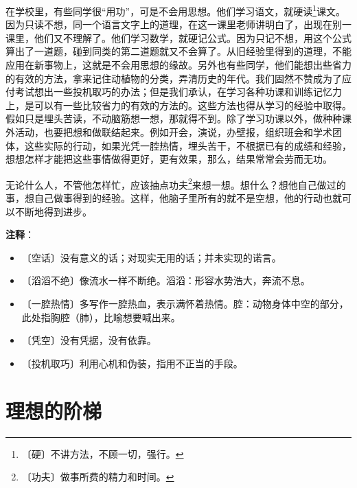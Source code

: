 \documentclass[12pt,UTF-8,openany]{ctexbook}
\begin{document}
\begin{normalsize}
    在学校里，有些同学很“用功”，可是不会用思想。他们学习语文，就硬读\footnote{〔硬〕不讲方法，不顾一切，强行。}课文。因为只读不想，同一个语言文字上的道理，在这一课里老师讲明白了，出现在别一课里，他们又不理解了。他们学习数学，就硬记公式。因为只记不想，用这个公式算出了一道题，碰到同类的第二道题就又不会算了。从旧经验里得到的道理，不能应用在新事物上，这就是不会用思想的缘故。另外也有些同学，他们能想出些省力的有效的方法，拿来记住动植物的分类，弄清历史的年代。我们固然不赞成为了应付考试想出一些投机取巧的办法；但是我们承认，在学习各种功课和训练记忆力上，是可以有一些比较省力的有效的方法的。这些方法也得从学习的经验中取得。假如只是埋头苦读，不动脑筋想一想，那就得不到。除了学习功课以外，做种种课外活动，也要把想和做联结起来。例如开会，演说，办壁报，组织班会和学术团体，这些实际的行动，如果光凭一腔热情，埋头苦干，不根据已有的成绩和经验，想想怎样才能把这些事情做得更好，更有效果，那么，结果常常会劳而无功。
    
    无论什么人，不管他怎样忙，应该抽点功夫\footnote{〔功夫〕做事所费的精力和时间。}来想一想。想什么？想他自己做过的事，想自己做事得到的经验。这样，他脑子里所有的就不是空想，他的行动也就可以不断地得到进步。
    
\end{normalsize}


\newpage

\textbf{注释}：

\vspace{-1em}

\begin{itemize}
    \setlength\itemsep{-0.2em}
    \item 〔空话〕没有意义的话；对现实无用的话；并未实现的诺言。
    \item 〔滔滔不绝〕像流水一样不断绝。滔滔：形容水势浩大，奔流不息。
    \item 〔一腔热情〕多写作一腔热血，表示满怀着热情。腔：动物身体中空的部分，此处指胸腔（肺），比喻想要喊出来。
    \item 〔凭空〕没有凭据，没有依靠。
    \item 〔投机取巧〕利用心机和伪装，指用不正当的手段。
\end{itemize}

\chapter{理想的阶梯}
\end{document}
